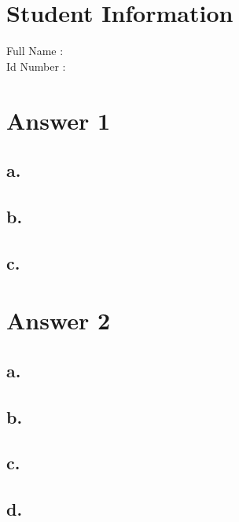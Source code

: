 \documentclass[12pt]{article}
\begin{document}
\section*{Student Information } 
Full Name :  \\
Id Number :  \\

\section*{Answer 1}

\subsection*{a.}

\subsection*{b.}

\subsection*{c.}




\section*{Answer 2}

\subsection*{a.}

\subsection*{b.}

\subsection*{c.}

\subsection*{d.}
\end{document}
